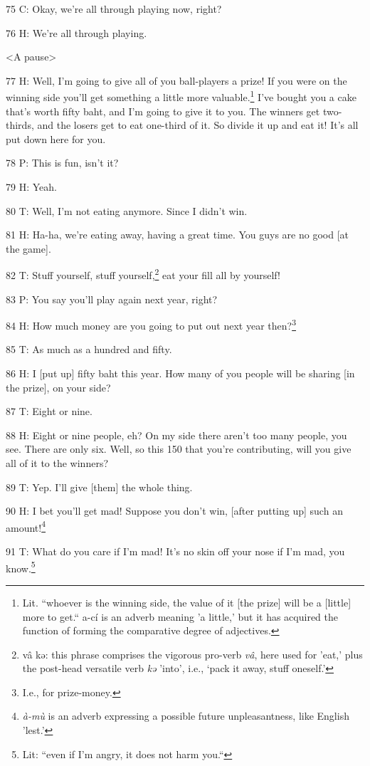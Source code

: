 75 C: Okay, we're all through playing now, right?

76 H: We're all through playing.

<A pause>

77 H: Well, I'm going to give all of you ball-players a prize! If you were on the
winning side you'll get something a little more valuable.\footnote{Lit. ``whoever is the winning side, the value of it [the prize] will be a [little] more to get.`` a-cí is an adverb meaning 'a little,' but it has acquired the function of forming the comparative degree of adjectives.} I've bought you a
cake that's worth fifty baht, and I'm going to give it to you. The winners get
two-thirds, and the losers get to eat one-third of it. So divide it up and eat
it! It's all put down here for you.

78 P: This is fun, isn't it?

79 H: Yeah.

80 T: Well, I'm not eating anymore. Since I didn't win.

81 H: Ha-ha, we're eating away, having a great time. You guys are no good [at the
game].

82 T: Stuff yourself, stuff yourself,\footnote{vâ kə: this phrase comprises the vigorous pro-verb \textit{vâ}, here used for 'eat,' plus the post-head versatile verb \textit{kə} 'into', i.e., `pack it away, stuff oneself.'} eat your fill all by yourself!

83 P: You say you'll play again next year, right?

84 H: How much money are you going to put out next year then?\footnote{I.e., for prize-money.}

85 T: As much as a hundred and fifty.

86 H: I [put up] fifty baht this year. How many of you people will be sharing [in
the prize], on your side?

87 T: Eight or nine.

88 H: Eight or nine people, eh? On my side there aren't too many people, you see.
There are only six. Well, so this 150 that you're contributing, will you give all
of it to the winners?

89 T: Yep. I'll give [them] the whole thing.

90 H: I bet you'll get mad! Suppose you don't win, [after putting up] such an amount!\footnote{\textit{à-mù} is an adverb expressing a possible future unpleasantness, like English 'lest.'}

91 T: What do you care if I'm mad! It's no skin off your nose if I'm mad, you know.\footnote{Lit: ``even if I'm angry, it does not harm you.``}

